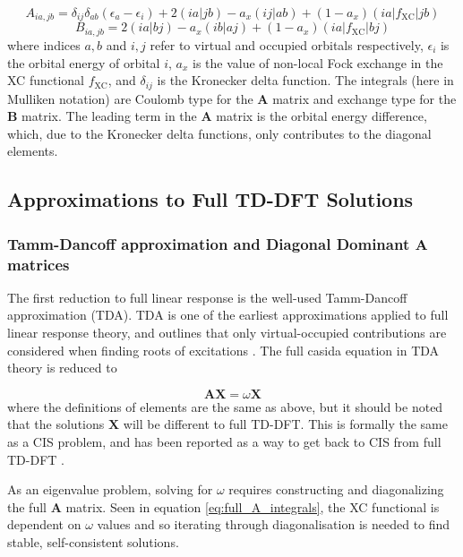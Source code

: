 \begin{equation}
A_{ia,jb} = \delta_{ij} \delta_{ab} \left( \epsilon_a - \epsilon_i \right) + 2\left(ia|jb\right) - a_x\left(ij|ab\right) + (1- a_x)\left(ia|f_{\text{XC}}|jb\right)
\end{equation}
%
\begin{equation}
B_{ia,jb} = 2\left(ia|bj\right) - a_x\left(ib|aj\right) + (1- a_x)\left(ia|f_{\text{XC}}|bj\right)
\end{equation}
%
where indices $a,b$ and $i,j$ refer to virtual and occupied orbitals respectively,
$\epsilon_i$ is the orbital energy of orbital $i$, $a_x$ is the value of non-local
Fock exchange in the XC functional $f_{\text{XC}}$, and $\delta_{ij}$ is the Kronecker
delta function. The integrals (here in Mulliken notation) are Coulomb type for the
$\mathbf{A}$ matrix and exchange type for the $\mathbf{B}$ matrix. The leading term
in the $\mathbf{A}$ matrix is the orbital energy difference, which, due to the Kronecker 
delta functions, only contributes to the diagonal elements.

\subsection{Approximations to Full TD-DFT Solutions}
\label{subsec:chl_approxs}
\subsubsection{Tamm-Dancoff approximation and Diagonal Dominant $\mathbf{A}$ matrices}
\label{subsubsec:Tamm_Dancoff}

The first reduction to full linear response is the well-used Tamm-Dancoff approximation (TDA). 
TDA is one of the earliest approximations applied to full linear response theory, 
and outlines that only virtual-occupied contributions are considered when finding
roots of excitations \cite{Hirata1999}. The full casida equation in TDA theory is 
reduced to

\begin{equation}
\mathbf{A} \mathbf{X} = \omega \mathbf{X}
\end{equation}
%
where the definitions of elements are the same as above, but it should be noted 
that the solutions $\mathbf{X}$ will be different to full TD-DFT. This is formally
the same as a CIS problem, and has been reported as a way to get back to CIS from 
full TD-DFT \cite{Yoshimine1992, Hirata1999}.

As an eigenvalue problem, solving for $\omega$ requires constructing and diagonalizing
the full $\mathbf{A}$ matrix. Seen in equation \ref{eq:full_A_integrals}, the XC
functional is dependent on $\omega$ values and so iterating through diagonalisation
is needed to find stable, self-consistent solutions.

